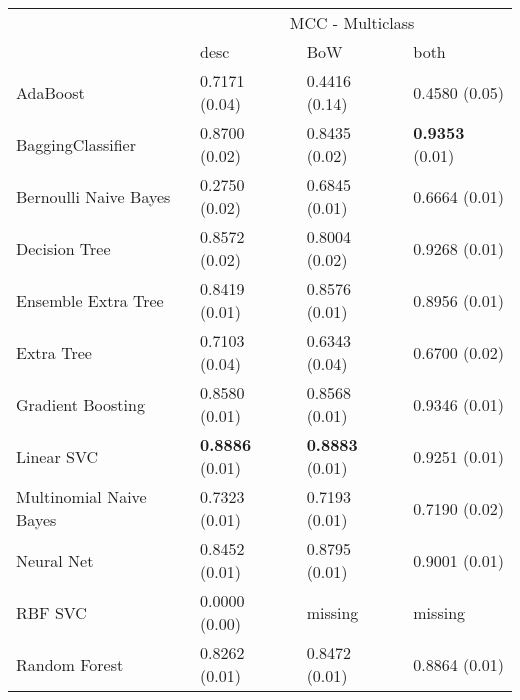 \begin{tabular}{|l|l|l|l| }
\hline
 &  \multicolumn{3}{c|}{ MCC - Multiclass} \\
\cline{2-4} & desc & BoW & both \\ \hline
AdaBoost                & 0.7171 (0.04) & 0.4416 (0.14) & 0.4580 (0.05)\\
BaggingClassifier       & 0.8700 (0.02) & 0.8435 (0.02) & {\bf 0.9353} (0.01)\\
Bernoulli Naive Bayes   & 0.2750 (0.02) & 0.6845 (0.01) & 0.6664 (0.01)\\
Decision Tree           & 0.8572 (0.02) & 0.8004 (0.02) & 0.9268 (0.01)\\
Ensemble Extra Tree     & 0.8419 (0.01) & 0.8576 (0.01) & 0.8956 (0.01)\\
Extra Tree              & 0.7103 (0.04) & 0.6343 (0.04) & 0.6700 (0.02)\\
Gradient Boosting       & 0.8580 (0.01) & 0.8568 (0.01) & 0.9346 (0.01)\\
Linear SVC              & {\bf 0.8886} (0.01) & {\bf 0.8883} (0.01) & 0.9251 (0.01)\\
Multinomial Naive Bayes & 0.7323 (0.01) & 0.7193 (0.01) & 0.7190 (0.02)\\
Neural Net              & 0.8452 (0.01) & 0.8795 (0.01) & 0.9001 (0.01)\\
RBF SVC                 & 0.0000 (0.00) & missing  & missing \\
Random Forest           & 0.8262 (0.01) & 0.8472 (0.01) & 0.8864 (0.01)\\
\hline
\end{tabular}